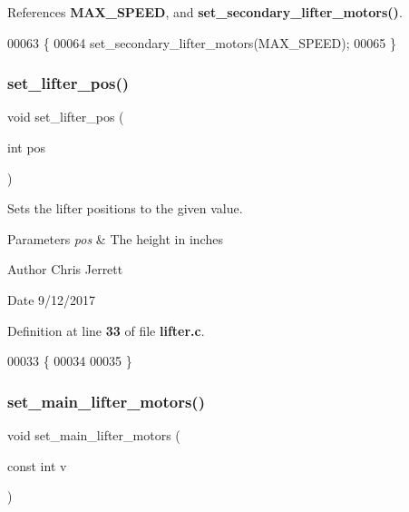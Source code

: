 References \textbf{ M\+A\+X\+\_\+\+S\+P\+E\+ED}, and \textbf{ set\+\_\+secondary\+\_\+lifter\+\_\+motors()}.


\begin{DoxyCode}
00063                              \{
00064   set_secondary_lifter_motors(MAX_SPEED);
00065 \}
\end{DoxyCode}
\mbox{\label{lifter_8h_abddc7cb502e12fa277b627c90a45efb1}} 
\subsubsection{set\+\_\+lifter\+\_\+pos()}
{\footnotesize\ttfamily void set\+\_\+lifter\+\_\+pos (\begin{DoxyParamCaption}\item[{int}]{pos }\end{DoxyParamCaption})}



Sets the lifter positions to the given value. 


\begin{DoxyParams}{Parameters}
{\em pos} & The height in inches \\
\hline
\end{DoxyParams}
\begin{DoxyAuthor}{Author}
Chris Jerrett 
\end{DoxyAuthor}
\begin{DoxyDate}{Date}
9/12/2017 
\end{DoxyDate}


Definition at line \textbf{ 33} of file \textbf{ lifter.\+c}.


\begin{DoxyCode}
00033                              \{
00034 
00035 \}
\end{DoxyCode}
\mbox{\label{lifter_8h_ad00a195af30f246924d6e1a30095b882}} 
\subsubsection{set\+\_\+main\+\_\+lifter\+\_\+motors()}
{\footnotesize\ttfamily void set\+\_\+main\+\_\+lifter\+\_\+motors (\begin{DoxyParamCaption}\item[{const int}]{v }\end{DoxyParamCaption})}



